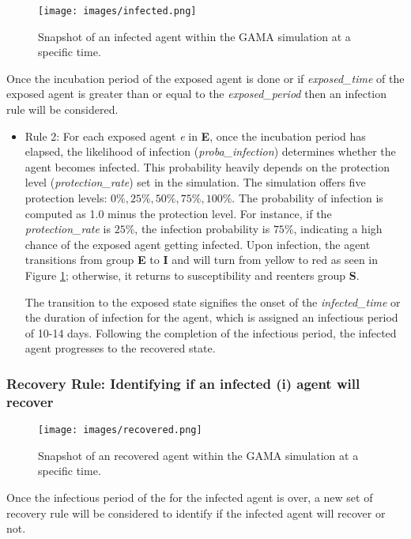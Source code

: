  \begin{figure}[H]
 	\centering
 	\texttt{[image: images/infected.png]}
 	\caption{ Snapshot of an infected agent within the GAMA simulation at a specific time.}
 	\label{infected}
 \end{figure}
 Once the incubation period of the exposed agent is done or if \textit{exposed\_time} of the exposed agent is greater than or equal to the \textit{exposed\_period} then an infection rule will be considered. 
 
 \begin{itemize}
 	\item Rule 2: For each exposed agent \textit{e} in \textbf{E}, once the incubation period has elapsed, the likelihood of infection (\textit{proba\_infection}) determines whether the agent becomes infected. This probability heavily depends on the protection level (\textit{protection\_rate}) set in the simulation. The simulation offers five protection levels: $0\%, 25\%, 50\%, 75\%, 100\%$. The probability of infection is computed as 1.0 minus the protection level. For instance, if the \textit{protection\_rate} is $25\%$, the infection probability is $75\%$, indicating a high chance of the exposed agent getting infected. Upon infection, the agent transitions from group \textbf{E} to \textbf{I} and will turn from yellow to red as seen in Figure \ref{infected}; otherwise, it returns to susceptibility and reenters group \textbf{S}.
 	
 	The transition to the exposed state signifies the onset of the \textit{infected\_time} or the duration of infection for the agent, which is assigned an infectious period of 10-14 days. Following the completion of the infectious period, the infected agent progresses to the recovered state. \\
 \end{itemize}
 
 
  \subsubsection{Recovery Rule: Identifying if an infected (i) agent will recover}
 \begin{figure}[H]
 	\centering
 	\texttt{[image: images/recovered.png]}
 	\caption{ Snapshot of an recovered agent within the GAMA simulation at a specific time.}
 	\label{recovered}
 \end{figure}
 Once the infectious period of the for the infected agent is over, a new set of recovery rule will be considered to identify if the infected agent will recover or not. 
 

